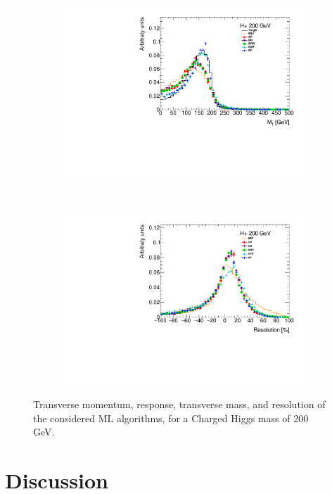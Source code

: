 \documentclass[twocolumn]{scrartcl}
\begin{document}
\begin{figure}
    \begin{subfigure}{.48\textwidth}
        \includegraphics[width=\textwidth]{plots/mt_200.pdf}
    \end{subfigure}
    ~
    \begin{subfigure}{.48\textwidth}
        \includegraphics[width=\textwidth]{plots/resolution_200.pdf}
    \end{subfigure}
    \caption{Transverse momentum, response, transverse mass, and resolution of the considered ML algorithms, for a Charged Higgs mass of 200 GeV.}\label{fig:result200}
\end{figure}




\section{Discussion}
\end{document}
